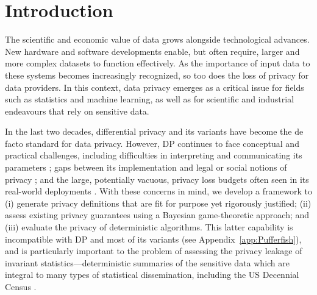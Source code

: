 \documentclass{article}
\theoremstyle{plain}
\theoremstyle{plain}
\theoremstyle{definition}
\theoremstyle{remark}
\theoremstyle{plain}
\begin{document}
\printAffiliationsAndNotice{}  %

\begin{abstract}
   We propose a novel framework for measuring privacy from a Bayesian game-theoretic perspective. This framework enables the creation of new, purpose-driven privacy definitions that are rigorously justified, while also allowing for the assessment of existing privacy guarantees through game theory. We show that pure and probabilistic differential privacy are special cases of our framework, and provide new interpretations of the post-processing inequality in this setting. Further, we demonstrate that privacy guarantees can be established for deterministic algorithms, which are overlooked by current privacy standards.
\end{abstract}

\section{Introduction}
The scientific and economic value of data grows alongside technological advances. New hardware and software developments enable, but often require, larger and more complex datasets to function effectively. As the importance of input data to these systems becomes increasingly recognized, so too does the loss of privacy for data providers. In this context, data privacy emerges as a critical issue for fields such as statistics and machine learning, as well as for scientific and industrial endeavours that rely on sensitive data.

In the last two decades, differential privacy \citep[DP,][]{dwork2006puredp, dwork2006approxdp, dwork2006differential} and its variants \citep[see][]{desfontaines2020sok} have become the de facto standard for data privacy. However, DP continues to face conceptual and practical challenges, including difficulties in interpreting and communicating its parameters \citep{cummingsCenteringPolicyPractice2023}; gaps between its implementation and legal or social notions of privacy \citep{seemanPrivacyUtilityDifferential2023}; and the large, potentially vacuous, privacy loss budgets often seen in its real-world deployments \citep{dworkDifferentialPrivacyPractice2019, schneiderWhyDataAnonymization2025a}. With these concerns in mind, we develop a framework to (i) generate privacy definitions that are fit for purpose yet rigorously justified; (ii) assess existing privacy guarantees using a Bayesian game-theoretic approach; and (iii) evaluate the privacy of deterministic algorithms. This latter capability is incompatible with DP and most of its variants (see Appendix~\ref{app:Pufferfish}), and is particularly important to the problem of assessing the privacy leakage of invariant statistics---deterministic summaries of the sensitive data which are integral to many types of statistical dissemination, including the US Decennial Census \citep{abowd2020CensusDisclosure2022, bailieRefreshmentStirredNot2025d}.
\end{document}
